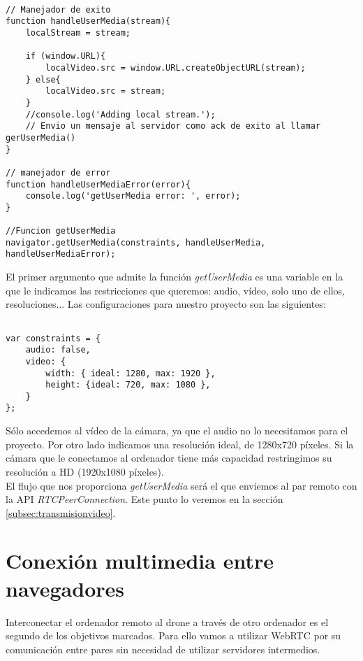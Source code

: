 \begin{lstlisting}[caption=getUserMedia.]

// Manejador de exito
function handleUserMedia(stream){
	localStream = stream;

	if (window.URL){
		localVideo.src = window.URL.createObjectURL(stream);
	} else{
		localVideo.src = stream;
	}
	//console.log('Adding local stream.');
	// Envio un mensaje al servidor como ack de exito al llamar gerUserMedia()	
}

// manejador de error
function handleUserMediaError(error){
	console.log('getUserMedia error: ', error);
}

//Funcion getUserMedia
navigator.getUserMedia(constraints, handleUserMedia, handleUserMediaError); 

\end{lstlisting}

El primer argumento que admite la función \emph{getUserMedia} es una variable en la que le indicamos las restricciones que queremos: audio, vídeo, solo uno de ellos, resoluciones... Las configuraciones para nuestro proyecto son las siguientes:\\

\begin{lstlisting}[caption=Restricciones de getUserMedia]

var constraints = {
    audio: false,
    video: {
        width: { ideal: 1280, max: 1920 },
        height: {ideal: 720, max: 1080 },
    }
};

\end{lstlisting}

Sólo accedemos al vídeo de la cámara, ya que el audio no lo necesitamos para el proyecto. Por otro lado indicamos una resolución ideal, de 1280x720 píxeles. Si la cámara que le conectamos al ordenador tiene más capacidad restringimos su resolución a HD (1920x1080 píxeles).\\

El flujo que nos proporciona \emph{getUserMedia} será el que enviemos al par remoto con la API \emph{RTCPeerConnection}. Este punto lo veremos en la sección \ref{subsec:transmisionvideo}.\\

\section{Conexión multimedia entre navegadores}

Interconectar el ordenador remoto al drone a través de otro ordenador es el segundo de los objetivos marcados. Para ello vamos a utilizar WebRTC por su comunicación entre pares sin necesidad de utilizar servidores intermedios.\\

